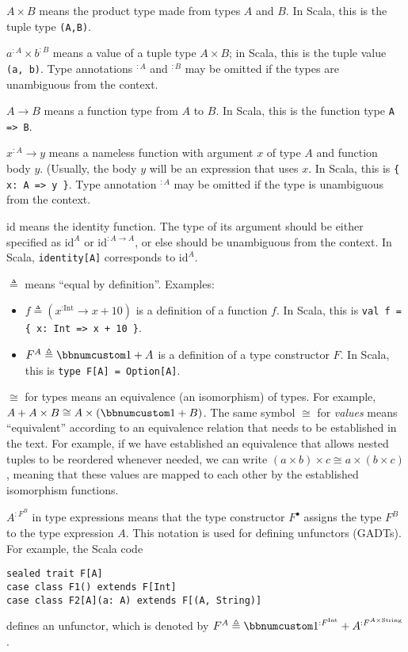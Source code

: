 $A\times B$ means the product type made from types $A$ and $B$.
In Scala, this is the tuple type \lstinline!(A,B)!.

$a^{:A}\times b^{:B}$ means a value of a tuple type $A\times B$;
in Scala, this is the tuple value \lstinline!(a, b)!. Type annotations
$^{:A}$ and $^{:B}$ may be omitted if the types are unambiguous
from the context.

$A\rightarrow B$ means a function type from $A$ to $B$. In Scala,
this is the function type \lstinline!A => B!.

$x^{:A}\rightarrow y$ means a nameless function with argument $x$
of type $A$ and function body $y$. (Usually, the body $y$ will
be an expression that uses $x$. In Scala, this is \lstinline!{ x: A => y }!.
Type annotation $^{:A}$ may be omitted if the type is unambiguous
from the context.

$\text{id}$ means the identity function. The type of its argument
should be either specified as $\text{id}^{A}$ or $\text{id}^{:A\rightarrow A}$,
or else should be unambiguous from the context. In Scala,  \lstinline!identity[A]!
corresponds to $\text{id}^{A}$.

$\triangleq$ means ``equal by definition''. Examples:
\begin{itemize}
\item $f\triangleq(x^{:\text{Int}}\rightarrow x+10)$ is a definition of
a function $f$. In Scala, this is \lstinline!val f = { x: Int => x + 10 }!.
\item $F^{A}\triangleq\bbnum 1+A$ is a definition of a type constructor
$F$. In Scala, this is \lstinline!type F[A] = Option[A]!.
\end{itemize}
$\cong$ for types means an equivalence (an isomorphism) of types.
For example, $A+A\times B\cong A\times\left(\bbnum 1+B\right)$. The
same symbol $\cong$ for \emph{values} means ``equivalent'' according
to an equivalence relation that needs to be established in the text.
For example, if we have established an equivalence that allows nested
tuples to be reordered whenever needed, we can write $\left(a\times b\right)\times c\cong a\times\left(b\times c\right)$,
meaning that these values are mapped to each other by the established
isomorphism functions. 

$A^{:F^{B}}$ in type expressions means that the type constructor
$F^{\bullet}$ assigns the type $F^{B}$ to the type expression $A$.
This notation is used for defining unfunctors (GADTs). For example,
the Scala code

\begin{lstlisting}
sealed trait F[A]
case class F1() extends F[Int]
case class F2[A](a: A) extends F[(A, String)]
\end{lstlisting}
defines an unfunctor, which is denoted by $F^{A}\triangleq\bbnum 1^{:F^{\text{Int}}}+A^{:F^{A\times\text{String}}}$.

